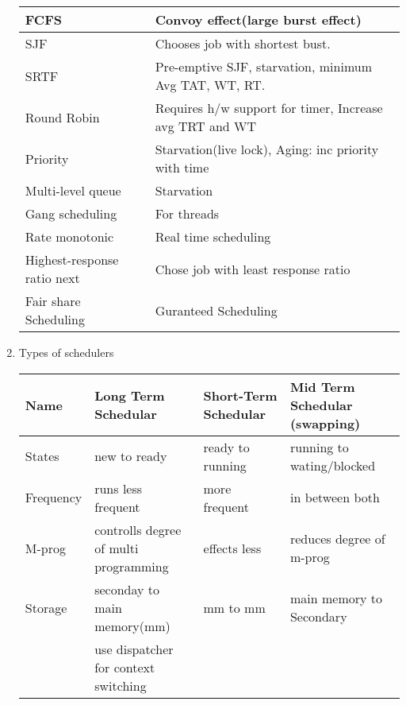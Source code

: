 \begin{enumerate}
  \begin{myTableStyle}
    \begin{tabular}{ |l|l| } \hline
        FCFS                &     Convoy effect(large burst effect)                             \\ \hline
        SJF                 &     Chooses job with shortest bust.                               \\ \hline
        SRTF                &     Pre-emptive SJF, starvation, minimum Avg TAT, WT, RT.         \\ \hline
        Round Robin         &     Requires h/w support for timer, Increase avg TRT and WT       \\ \hline
        Priority            &     Starvation(live lock), Aging: inc priority with time         \\ \hline
        Multi-level queue   &     Starvation                                                    \\ \hline
        Gang scheduling     &     For threads                                                    \\ \hline
        Rate monotonic      &     Real time scheduling                                          \\ \hline
        Highest-response ratio next & Chose job with least response ratio                       \\ \hline
        Fair share Scheduling & Guranteed Scheduling                                            \\ \hline
    \end{tabular}
  \end{myTableStyle}

  \item Types of schedulers \\
  \begin{myTableStyle}
    \begin{tabular}{ |l|l|m{2.8cm}|m{4cm}| } \hline
        Name      & Long Term Schedular                   & Short-Term Schedular  & Mid Term Schedular (swapping)\\ \hline
        States    & new to ready                          & ready to running      & running to wating/blocked   \\ \hline
        Frequency & runs less frequent                    & more frequent         & in between both             \\ \hline
        M-prog    & controlls degree of multi programming & effects less          & reduces degree of m-prog    \\ \hline
        Storage   & seconday to main memory(mm)           & mm to mm              & main memory to Secondary    \\ \hline
                  & use dispatcher for context switching  & &                                                   \\ \hline
    \end{tabular}
  \end{myTableStyle}




\end{enumerate}
